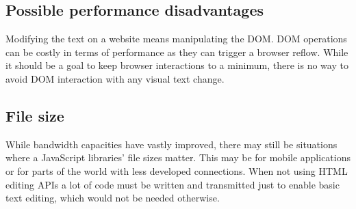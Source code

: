 
\subsection{Possible performance disadvantages}

Modifying the text on a website means manipulating the DOM. DOM operations can be costly in terms of performance as they can trigger a browser reflow\cite{br}. While it should be a goal to keep browser interactions to a minimum, there is no way to avoid DOM interaction with any visual text change.



\subsection{File size} While bandwidth capacities have vastly improved, there may still be situations where a JavaScript libraries' file sizes matter. This may be for mobile applications or for parts of the world with less developed connections. When not using HTML editing APIs a lot of code must be written and transmitted just to enable basic text editing, which would not be needed otherwise.